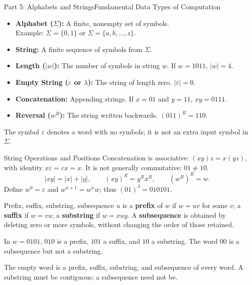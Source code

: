 \documentclass[10pt]{beamer}
\begin{document}
\begin{frame}{Part 5: Alphabets and Strings}{Fundamental Data Types of Computation}
  \small
  \begin{itemize}
      \item \textbf{Alphabet ($\Sigma$):} A finite, nonempty set of symbols. \\Example: $\Sigma = \{0, 1\}$ or $\Sigma = \{a, b, \dots, z\}$.
      \pause
      \item \textbf{String:} A finite sequence of symbols from $\Sigma$.
      \item \textbf{Length ($|w|$):} The number of symbols in string $w$. If $w = 1011$, $|w| = 4$.
      \pause
      \item \textbf{Empty String ($\varepsilon$ or $\lambda$):} The string of length zero. $|\varepsilon| = 0$.
      \item \textbf{Concatenation:} Appending strings. If $x = 01$ and $y = 11$, $xy = 0111$.
      \item \textbf{Reversal ($w^R$):} The string written backwards. $(011)^R = 110$.
  \end{itemize}
  The symbol $\varepsilon$ denotes a word with no symbols; it is not an
  extra input symbol in $\Sigma$.
\end{frame}

\begin{frame}{String Operations and Positions}
  \small
  Concatenation is associative: $(xy)z=x(yz)$, with identity
  $x\varepsilon=\varepsilon x=x$. It is not generally commutative:
  $01\ne10$.
  \[
    |xy|=|x|+|y|,\qquad (xy)^R=y^Rx^R,\qquad (w^R)^R=w.
  \]
  Define $w^0=\varepsilon$ and $w^{n+1}=w^n w$; thus $(01)^3=010101$.
  \pause
  \begin{block}{Prefix, suffix, substring, subsequence}
    $u$ is a \textbf{prefix} of $w$ if $w=uv$ for some $v$; a
    \textbf{suffix} if $w=vu$; a \textbf{substring} if $w=xuy$.
    A \textbf{subsequence} is obtained by deleting zero or more symbols,
    without changing the order of those retained.
    \par\smallskip
    In $w=0101$, $010$ is a prefix, $101$ a suffix, and $10$ a substring.
    The word $00$ is a subsequence but not a substring.
  \end{block}
  \pause
  The empty word is a prefix, suffix, substring, and subsequence of every
  word. A substring must be contiguous; a subsequence need not be.
\end{frame}
\end{document}
